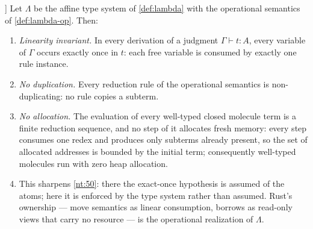 \begin{theorem}[The no-allocation theorem, NT55 [N]]\label{nt:55}
Let $\Lambda$ be the affine type system of \autoref{def:lambda} with the operational semantics of \autoref{def:lambda-op}. Then:
\begin{enumerate}
\item[(i)] \emph{Linearity invariant.} In every derivation of a judgment $\Gamma \vdash t : A$, every variable of $\Gamma$ occurs exactly once in $t$: each free variable is consumed by exactly one rule instance.
\item[(ii)] \emph{No duplication.} Every reduction rule of the operational semantics is non-duplicating: no rule copies a subterm.
\item[(iii)] \emph{No allocation.} The evaluation of every well-typed closed molecule term is a finite reduction sequence, and no step of it allocates fresh memory: every step consumes one redex and produces only subterms already present, so the set of allocated addresses is bounded by the initial term; consequently well-typed molecules run with zero heap allocation.
\item[(iv)] This sharpens \autoref{nt:50}: there the exact-once hypothesis is assumed of the atoms; here it is enforced by the type system rather than assumed. Rust's ownership --- move semantics as linear consumption, borrows as read-only views that carry no resource --- is the operational realization of $\Lambda$.
\end{enumerate}
\end{theorem}

